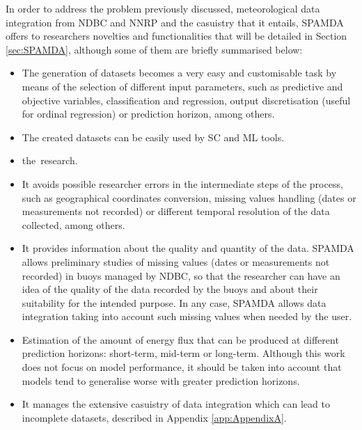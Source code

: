 \documentclass[energies,article,accept,moreauthors,pdftex]{Definitions/mdpi}
\begin{document}
		In order to address the problem previously discussed, meteorological data integration from NDBC and NNRP and the casuistry that it entails, SPAMDA offers to researchers novelties and functionalities that will be detailed in Section \ref{sec:SPAMDA}, although some of them are briefly summarised below:
		\begin{itemize}
			\item The generation of datasets becomes a very easy and customisable task by means of the selection of different input parameters, such as predictive and objective variables, classification and regression, output discretisation (useful for ordinal regression) or prediction horizon, among others.
			
			\item The created datasets can be easily used by SC and ML tools. 
			
			\item {} \mbox{the~research.}
			
			\item It avoids possible researcher errors in the intermediate steps of the process, such as geographical coordinates conversion, missing values handling (dates or measurements not recorded) or different temporal resolution of the data collected, among others.
			
			\item It provides information about the quality and quantity of the data. SPAMDA allows preliminary studies of missing values (dates or measurements not recorded) in buoys managed by NDBC, so that the researcher can have an idea of the quality of the data recorded by the buoys and about their suitability for the intended purpose. In any case, SPAMDA allows data integration taking into account such missing values when needed by the user.
			
			\item Estimation of the amount of energy flux that can be produced at different prediction horizons: short-term, mid-term or long-term. Although this work does not focus on model performance, it should be taken into account that models tend to generalise worse with greater prediction horizons.
						
			\item It manages the extensive casuistry of data integration which can lead to incomplete datasets, described in Appendix \ref{app:AppendixA}.
			

\end{itemize}
\end{document}
